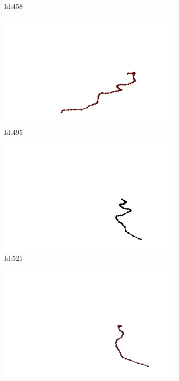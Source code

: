 \documentclass[12pt,twoside]{report}
\begin{document}
\begin{figure}
\begin{subfigure}[b]{0.20\textwidth}
\caption{Id:458}
\end{subfigure}
\begin{subfigure}[b]{0.20\textwidth}
\centering
\includegraphics[width=\textwidth]{../trajectories/495.png}
\caption{Id:495}
\end{subfigure}
\begin{subfigure}[b]{0.20\textwidth}
\centering
\includegraphics[width=\textwidth]{../trajectories/521.png}
\caption{Id:521}
\end{subfigure}
\begin{subfigure}[b]{0.20\textwidth}
\centering
\includegraphics[width=\textwidth]{../trajectories/550.png}

\end{subfigure}
\end{figure}
\end{document}
